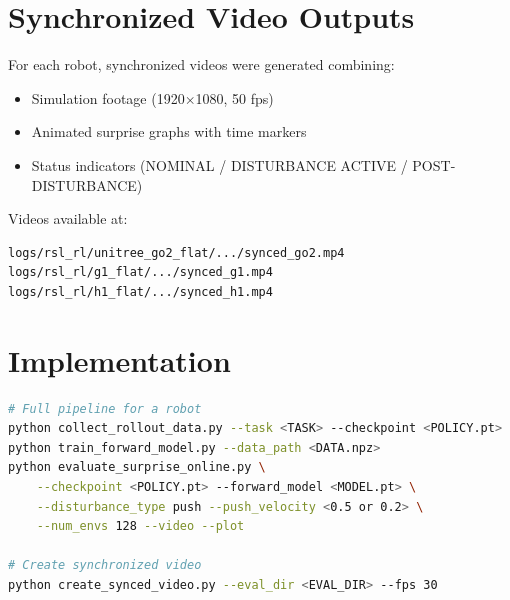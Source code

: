 \documentclass[11pt,a4paper]{article}
\begin{document}
\section{Synchronized Video Outputs}

For each robot, synchronized videos were generated combining:
\begin{itemize}
    \item Simulation footage (1920$\times$1080, 50 fps)
    \item Animated surprise graphs with time markers
    \item Status indicators (NOMINAL / DISTURBANCE ACTIVE / POST-DISTURBANCE)
\end{itemize}

Videos available at:
\begin{lstlisting}
logs/rsl_rl/unitree_go2_flat/.../synced_go2.mp4
logs/rsl_rl/g1_flat/.../synced_g1.mp4
logs/rsl_rl/h1_flat/.../synced_h1.mp4
\end{lstlisting}

\section{Implementation}

\begin{lstlisting}[language=bash]
# Full pipeline for a robot
python collect_rollout_data.py --task <TASK> --checkpoint <POLICY.pt>
python train_forward_model.py --data_path <DATA.npz>
python evaluate_surprise_online.py \
    --checkpoint <POLICY.pt> --forward_model <MODEL.pt> \
    --disturbance_type push --push_velocity <0.5 or 0.2> \
    --num_envs 128 --video --plot

# Create synchronized video
python create_synced_video.py --eval_dir <EVAL_DIR> --fps 30
\end{lstlisting}
\end{document}

